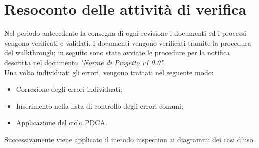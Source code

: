 \documentclass[12pt,a4paper,titlepage]{article}
\begin{document}
	\section{Resoconto delle attività di verifica}
	Nel periodo antecedente la consegna di ogni revisione i documenti ed i processi vengono verificati e validati. I documenti vengono verificati tramite la procedura del walkthrough; in seguito sono state avviate le procedure per la notifica descritta nel documento \textit{"Norme di Progetto v1.0.0"}.\\
	Una volta individuati gli errori, vengono trattati nel seguente modo:
	\begin{itemize}
		\item Correzione degli errori individuati;
		\item Inserimento nella lista di controllo degli errori comuni;
		\item Applicazione del ciclo PDCA.
	\end{itemize}
	Successivamente viene applicato il metodo inspection ai diagrammi dei casi d'uso.
\end{document}

